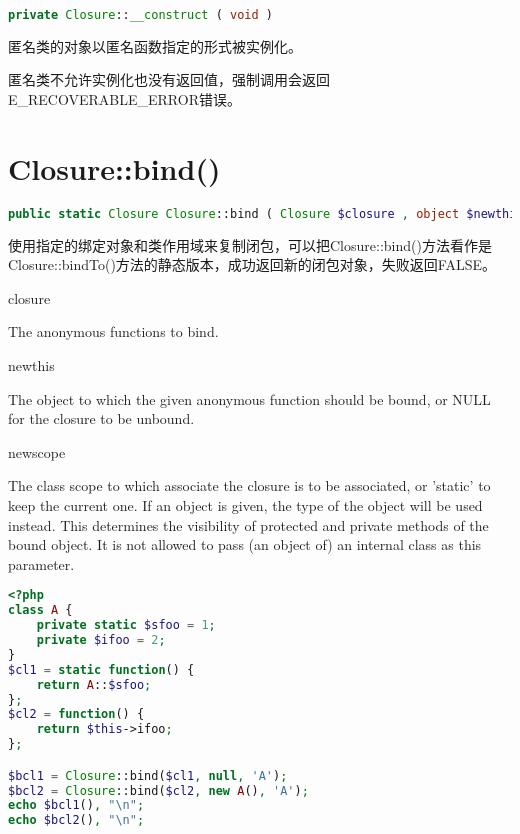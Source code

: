 \begin{lstlisting}[language=PHP]
private Closure::__construct ( void )
\end{lstlisting}

匿名类的对象以匿名函数指定的形式被实例化。

匿名类不允许实例化也没有返回值，强制调用会返回E\_RECOVERABLE\_ERROR错误。

\section{Closure::bind()}




\begin{lstlisting}[language=PHP]
public static Closure Closure::bind ( Closure $closure , object $newthis [, mixed $newscope = "static" ] )
\end{lstlisting}

使用指定的绑定对象和类作用域来复制闭包，可以把Closure::bind()方法看作是Closure::bindTo()方法的静态版本，成功返回新的闭包对象，失败返回FALSE。

\begin{compactitem}
\item closure

The anonymous functions to bind.

\item newthis

The object to which the given anonymous function should be bound, or NULL for the closure to be unbound.

\item newscope

The class scope to which associate the closure is to be associated, or 'static' to keep the current one. If an object is given, the type of the object will be used instead. This determines the visibility of protected and private methods of the bound object. It is not allowed to pass (an object of) an internal class as this parameter.

\end{compactitem}




\begin{lstlisting}[language=PHP]
<?php
class A {
    private static $sfoo = 1;
    private $ifoo = 2;
}
$cl1 = static function() {
    return A::$sfoo;
};
$cl2 = function() {
    return $this->ifoo;
};

$bcl1 = Closure::bind($cl1, null, 'A');
$bcl2 = Closure::bind($cl2, new A(), 'A');
echo $bcl1(), "\n";
echo $bcl2(), "\n";
\end{lstlisting}

